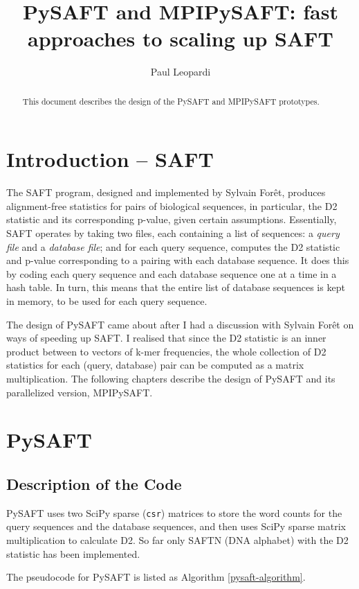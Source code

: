 \documentclass[11pt]{report}
\title{PySAFT and MPIPySAFT: fast approaches to scaling up SAFT}
\author{Paul Leopardi}
\begin{document}
\maketitle

\begin{abstract}
This document describes the design of the PySAFT and MPIPySAFT prototypes.
\end{abstract}
\chapter{Introduction -- SAFT}
The SAFT program, designed and implemented by Sylvain For\^et,
produces alignment-free statistics for pairs of biological sequences,
in particular, the D2 statistic and its corresponding p-value, given certain assumptions.
Essentially, SAFT operates by taking two files, each containing a list of sequences: 
a \emph{query file} and a \emph{database file}; 
and for each query sequence, computes the D2 statistic and p-value corresponding to a pairing
with each database sequence. 
It does this by coding each query sequence and each database sequence one at a time in a hash table. 
In turn, this means that the entire list of database sequences is kept in memory,
to be used for each query sequence.

The design of PySAFT came about after I had a discussion with Sylvain For\^et on ways of speeding up SAFT.
I realised that since the D2 statistic is an inner product between to vectors of k-mer frequencies,
the whole collection of D2 statistics for each (query, database) pair can be computed as a matrix multiplication.
The following chapters describe the design of PySAFT and its parallelized version, MPIPySAFT.
\chapter{PySAFT}
\section{Description of the Code}

PySAFT uses two SciPy sparse (\verb!csr!) matrices to store the word counts for the 
query sequences and the database sequences, and then uses SciPy sparse 
matrix multiplication to calculate D2. 
So far only SAFTN (DNA alphabet) with the D2 statistic has been implemented. 

The pseudocode for PySAFT is listed as Algorithm \ref{pysaft-algorithm}.
\end{document}
